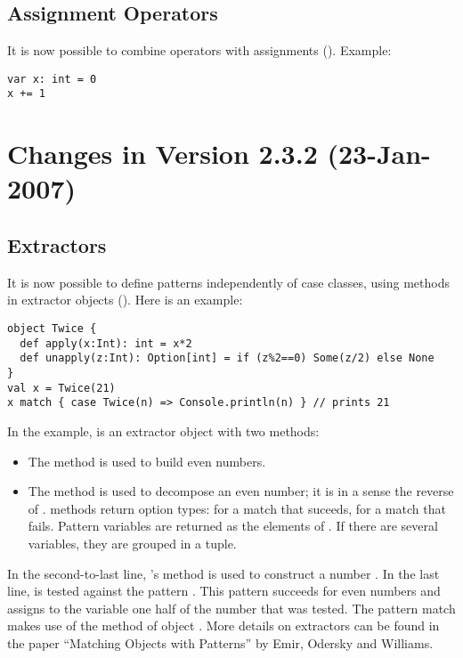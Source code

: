 \subsection*{Assignment Operators}

It is now possible to combine operators with assignments (). Example:
\begin{lstlisting}
var x: int = 0
x += 1
\end{lstlisting}

\section*{Changes in Version 2.3.2 (23-Jan-2007)}

\subsection*{Extractors}

It is now possible to define patterns independently of case classes,
using  methods in extractor objects
(). 
Here is an example:
\begin{lstlisting}
object Twice {                              
  def apply(x:Int): int = x*2
  def unapply(z:Int): Option[int] = if (z%2==0) Some(z/2) else None
}
val x = Twice(21) 
x match { case Twice(n) => Console.println(n) } // prints 21
\end{lstlisting}
In the example, \lstinline@Twice@ is an extractor object with two methods:
\begin{itemize}
\item
The  method is used to build even numbers.
\item
The  method is used to decompose an even number; it is
in a sense the reverse of . \lstinline@unapply@ methods return option types: 
 for a match that suceeds,  for a match that fails.
Pattern variables are returned as the elements of . If there are several
variables, they are grouped in a tuple.
\end{itemize}
In the second-to-last line, 's  method is used
to construct a number . In the last line,  is tested
against the pattern
. This pattern succeeds for even numbers and assigns to the variable
 one half of the number that was tested. The pattern match makes use of
the  method of object . More details on extractors can be found
in the paper ``Matching Objects with Patterns'' by Emir, Odersky and Williams.
 
